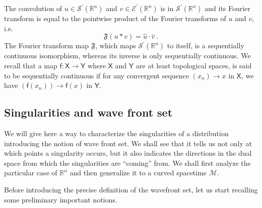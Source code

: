 \documentclass[11pt]{book}
\newcommand{\Ecal}{\mathcal{E}}
\newcommand{\Mcal}{\mathcal{M}}
\newcommand{\Scal}{\mathcal{S}}
\newcommand{\Rbb}{\mathbb{R}}
\newcommand{\Frak}{\mathfrak{F}}
\newcommand{\Xsf}{\mathsf{X}}
\newcommand{\Ysf}{\mathsf{Y}}
\newcommand{\fsf}{\mathsf{f}}
\theoremstyle{break}
\begin{document}
The convolution of $u \in \Scal^\prime(\Rbb^n)$ and $v\in \Ecal^\prime(\Rbb^n)$ is in $\Scal^\prime(\Rbb^n)$ and its Fourier transform is equal to the pointwise product of the Fourier transforms of $u$ and $v$, i.e.
%
\begin{equation*}
\Frak(u \ast v) = \hat{u} \cdot \hat{v} \ .
\end{equation*}
%
The Fourier transform map $\Frak$, which maps $\Scal^\prime(\Rbb^n)$ to itself, is a sequentially continuous isomorphism, whereas its inverse is only sequentially continuous. We recall that a map $\fsf : \Xsf \to \Ysf$ where $\Xsf$ and $\Ysf$ are at least topological spaces, is said to be sequentially continuous if for any convergent sequence $(x_n) \to x$ in $\Xsf$, we have $(\fsf(x_n)) \to \fsf(x)$ in $\Ysf$. 


\subsection{Singularities and wave front set}
\label{p:SING_WF}


We will give here a way to characterize the singularities of a distribution introducing the notion of wave front set. We shall see that it tells us not only at which points a singularity occurs, but it also indicates the directions in the dual space from which the singularities are ``coming'' from. We shall first analyze the particular case of $\Rbb^n$ and then generalize it to a curved spacetime $\Mcal$. 


Before introducing the precise definition of the wavefront set, let us start recalling some preliminary important notions.
\end{document}
